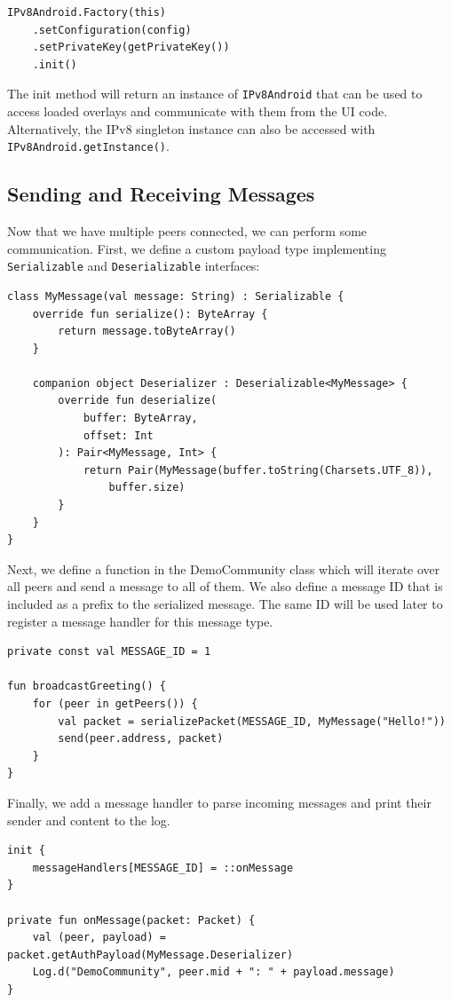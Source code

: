 \begin{verbatim}
IPv8Android.Factory(this)
    .setConfiguration(config)
    .setPrivateKey(getPrivateKey())
    .init()
\end{verbatim}

The init method will return an instance of \texttt{IPv8Android} that can be used to access loaded overlays and communicate with them from the UI code. Alternatively, the IPv8 singleton instance can also be accessed with \texttt{IPv8Android.getInstance()}.


\subsection{Sending and Receiving Messages}

Now that we have multiple peers connected, we can perform some communication. First, we define a custom payload type implementing \texttt{Serializable} and \texttt{Deserializable} interfaces:

\begin{verbatim}
class MyMessage(val message: String) : Serializable {
    override fun serialize(): ByteArray {
        return message.toByteArray()
    }

    companion object Deserializer : Deserializable<MyMessage> {
        override fun deserialize(
            buffer: ByteArray,
            offset: Int
        ): Pair<MyMessage, Int> {
            return Pair(MyMessage(buffer.toString(Charsets.UTF_8)),
                buffer.size)
        }
    }
}
\end{verbatim}

Next, we define a function in the DemoCommunity class which will iterate over all peers and send a message to all of them. We also define a message ID that is included as a prefix to the serialized message. The same ID will be used later to register a message handler for this message type.

\begin{verbatim}
private const val MESSAGE_ID = 1

fun broadcastGreeting() {
    for (peer in getPeers()) {
        val packet = serializePacket(MESSAGE_ID, MyMessage("Hello!"))
        send(peer.address, packet)
    }
}
\end{verbatim}

Finally, we add a message handler to parse incoming messages and print their sender and content to the log.

\begin{verbatim}
init {
    messageHandlers[MESSAGE_ID] = ::onMessage
}

private fun onMessage(packet: Packet) {
    val (peer, payload) = packet.getAuthPayload(MyMessage.Deserializer)
    Log.d("DemoCommunity", peer.mid + ": " + payload.message)
}
\end{verbatim}

